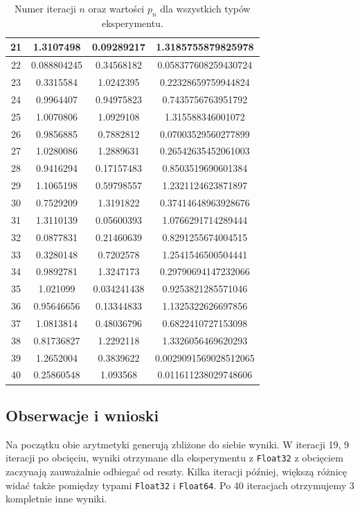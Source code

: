 \documentclass{article}
\begin{document}
\begin{table}[H]
\begin{adjustbox}{center}
\begin{tabular}{|c|c|c|c|}
    \hline
    21 & 1.3107498 & 0.09289217 & 1.3185755879825978\\
    \hline
    22 & 0.088804245 & 0.34568182 & 0.058377608259430724\\
    \hline
    23 & 0.3315584 & 1.0242395 & 0.22328659759944824\\
    \hline
    24 & 0.9964407 & 0.94975823 & 0.7435756763951792\\
    \hline
    25 & 1.0070806 & 1.0929108 & 1.315588346001072\\
    \hline
    26 & 0.9856885 & 0.7882812 & 0.07003529560277899\\
    \hline
    27 & 1.0280086 & 1.2889631 & 0.26542635452061003\\
    \hline
    28 & 0.9416294 & 0.17157483 & 0.8503519690601384\\
    \hline
    29 & 1.1065198 & 0.59798557 & 1.2321124623871897\\
    \hline
    30 & 0.7529209 & 1.3191822 & 0.37414648963928676\\
    \hline
    31 & 1.3110139 & 0.05600393 & 1.0766291714289444\\
    \hline
    32 & 0.0877831 & 0.21460639 & 0.8291255674004515\\
    \hline
    33 & 0.3280148 & 0.7202578 & 1.2541546500504441\\
    \hline
    34 & 0.9892781 & 1.3247173 & 0.29790694147232066\\
    \hline
    35 & 1.021099 & 0.034241438 & 0.9253821285571046\\
    \hline
    36 & 0.95646656 & 0.13344833 & 1.1325322626697856\\
    \hline
    37 & 1.0813814 & 0.48036796 & 0.6822410727153098\\
    \hline
    38 & 0.81736827 & 1.2292118 & 1.3326056469620293\\
    \hline
    39 & 1.2652004 & 0.3839622 & 0.0029091569028512065\\
    \hline
    40 & 0.25860548 & 1.093568 & 0.011611238029748606\\
    \hline
\end{tabular}
\end{adjustbox}
\caption{Numer iteracji $n$ oraz wartości $p_{n}$ dla wszystkich typów eksperymentu.}
\end{table}

\subsection{Obserwacje i wnioski}
Na początku obie arytmetyki generują zbliżone do siebie wyniki. W iteracji 19, 9 iteracji po obcięciu, wyniki otrzymane
dla eksperymentu z \texttt{Float32} z obcięciem zaczynają zauważalnie odbiegać od reszty. Kilka iteracji później,
większą różnicę widać także pomiędzy typami \texttt{Float32} i \texttt{Float64}. Po 40 iteracjach otrzymujemy 3
kompletnie inne wyniki.
\end{document}
